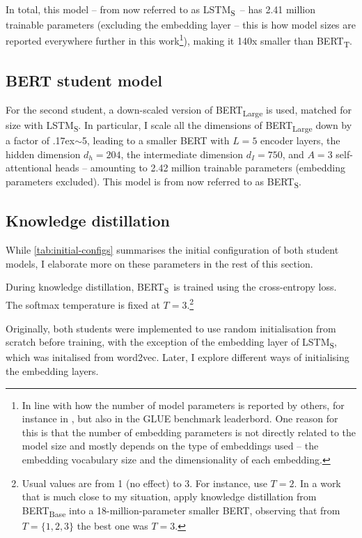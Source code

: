 \documentclass[bsc,frontabs,singlespacing,parskip,deptreport]{infthesis}
\def\mytilde{{\raise.17ex\hbox{$\scriptstyle\sim$}}}
\def\BERTT{BERT\textsubscript{T}}
\def\BERTS{BERT\textsubscript{S}}
\def\LSTMS{LSTM\textsubscript{S}}
\begin{document}
{{{      In total, this model -- from now referred to as \LSTMS~-- has 2.41 million trainable parameters (excluding the embedding layer -- this is how model sizes are reported everywhere further in this work\footnote{In line with how the number of model parameters is reported by others, for instance in \citet{Tang_2019b,Tang_2019a}, but also in the GLUE benchmark leaderbord. One reason for this is that the number of embedding parameters is not directly related to the model size and mostly depends on the type of embeddings used -- the embedding vocabulary size and the dimensionality of each embedding.}), making it 140x smaller than \BERTT.
    }

    \subsection{BERT student model}{
      \label{sec:student-bert}
      For the second student, a down-scaled version of BERT\textsubscript{Large} is used, matched for size with \LSTMS. In particular, I scale all the dimensions of BERT\textsubscript{Large} down by a factor of \mytilde5, leading to a smaller BERT with $L=5$ encoder layers, the hidden dimension $d_h=204$, the intermediate dimension $d_I=750$, and $A=3$ self-attentional heads -- amounting to 2.42 million trainable parameters (embedding parameters excluded). This model is from now referred to as \BERTS.
    }

    \subsection{Knowledge distillation}{
      While \autoref{tab:initial-configs} summarises the initial configuration of both student models, I elaborate more on these parameters in the rest of this section.

      During knowledge distillation, \BERTS~is trained using the cross-entropy loss. The softmax temperature is fixed at $T=3$.\footnote{Usual values are from 1 (no effect) to 3. For instance, \citet{Sanh_2019} use $T=2$. In a work that is much close to my situation, \citet{Tsai_2019} apply knowledge distillation from BERT\textsubscript{Base} into a 18-million-parameter smaller BERT, observing that from $T=\{1, 2, 3\}$ the best one was $T=3$.}
      
      Originally, both students were implemented to use random initialisation from scratch before training, with the exception of the embedding layer of \LSTMS, which was initalised from word2vec. Later, I explore different ways of initialising the embedding layers.
      
}}}
\end{document}
